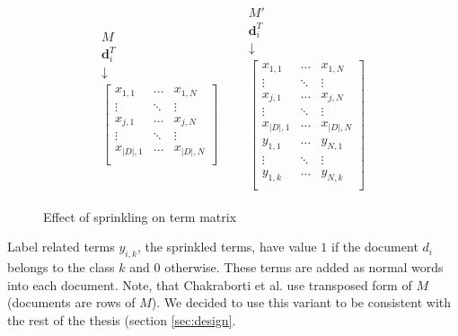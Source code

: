 \begin{figure}[h]
\centering
    \begin{equation*}
\begin{matrix} 
\begin{matrix} 
M  \\
\textbf{d}_i^T  \\
\downarrow \\
\begin{bmatrix}
x_{1,1}& \dots&  x_{1,N} \\
\vdots &  \ddots & \vdots \\
x_{j,1}& \dots & x_{j,N} \\
\vdots & \ddots & \vdots \\
x_{|D|,1} &\dots&  x_{|D|,N} \\
\end{bmatrix}
\end{matrix}
&
&
\begin{matrix} 
M'  \\
\textbf{d}_i^T  \\
\downarrow \\
\begin{bmatrix}
x_{1,1}& \dots&  x_{1,N} \\
\vdots &  \ddots & \vdots \\
x_{j,1}& \dots & x_{j,N} \\
\vdots & \ddots & \vdots \\
x_{|D|,1} &\dots&  x_{|D|,N} \\
\hline 
y_{1,1} &\dots&  y_{N,1} \\
\vdots & \ddots & \vdots \\
y_{1,k} &\dots&  y_{N,k} \\

\end{bmatrix}
\end{matrix}
\end{matrix}
\end{equation*}

\caption{Effect of sprinkling on term matrix}
\end{figure}

    Label related terms $y_{i,k}$, the sprinkled terms, have value $1$ if the document $d_i$ belongs to the class $k$ and $0$ otherwise.
    These terms are added as normal words into each document.
    Note, that Chakraborti et al. use transposed form of $M$ (documents are rows of $M$).
    We decided to use this variant to be consistent with the rest of the thesis (section \ref{sec:design}.
    

